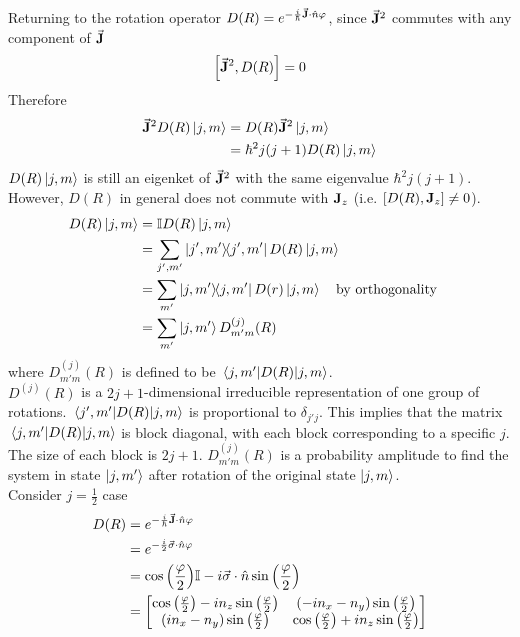\documentclass[12pt,a4paper,titlepage]{article}
\begin{document}
Returning to the rotation operator $D(R)=e^{-\frac{i}{\hbar}\vec{\vb{J}}\cdot\hat{n}\varphi}$, since $\vec{\vb{J}}^{2}$ commutes with any component of $\vec{\vb{J}}$
\begin{equation}
\comm{\vec{\vb{J}}^{2}}{D(R)}=0
\end{equation}
Therefore
\begin{equation}
\begin{aligned}
\vec{\vb{J}}^{2}D(R)\ket{j,m}&=D(R)\vec{\vb{J}}^{2}\ket{j,m}\\
&=\hbar^{2}j(j+1)D(R)\ket{j,m}
\end{aligned}
\end{equation}
$D(R)\ket{j,m}$ is still an eigenket of $\vec{\vb{J}}^{2}$ with the same eigenvalue $\hbar^{2}j(j+1)$. However, $D(R)$ in general does not commute with $\vb{J}_{z}$ (i.e. $\comm{D(R)}{\vb{J}_{z}}\neq 0$).
\begin{equation}
\begin{aligned}
D(R)\ket{j,m}&=\mathbb{I}D(R)\ket{j,m}\\
&=\sum_{j',m'}\op{j',m'}D(R)\ket{j,m}\\
&=\sum_{m'}\op{j,m'}D(r)\ket{j,m}\qq{by orthogonality}\\
&=\sum_{m'}\ket{j,m'}D_{m'm}^{(j)}(R)
\end{aligned}
\end{equation}
where $D_{m'm}^{(j)}(R)$ is defined to be $\mel{j,m'}{D(R)}{j,m}$.\\

$D^{(j)}(R)$ is a $2j+1$-dimensional irreducible representation of one group of rotations. $\mel{j',m'}{D(R)}{j,m}$ is proportional to $\delta_{j'j}$. This implies that the matrix $\mel{j,m'}{D(R)}{j,m}$ is block diagonal, with each block corresponding to a specific $j$. The size of each block is $2j+1$. $D_{m'm}^{(j)}(R)$ is a probability amplitude to find the system in state $\ket{j,m'}$ after rotation of the original state $\ket{j,m}$.\\

Consider $j=\frac{1}{2}$ case
\begin{equation}
\begin{aligned}
D(R)&=e^{-\frac{i}{\hbar}\vec{\vb{J}}\cdot\hat{n}\varphi}\\
&=e^{-\frac{i}{2}\vec{\sigma}\cdot\hat{n}\varphi}\\
&=\cos\qty(\frac{\varphi}{2})\mathbb{I}-i\vec{\sigma}\cdot\hat{n}\sin\qty(\frac{\varphi}{2})\\
&=\mqty[\cos\qty(\frac{\varphi}{2})-in_{z}\sin\qty(\frac{\varphi}{2}) & (-in_{x}-n_{y})\sin\qty(\frac{\varphi}{2})\\ (in_{x}-n_{y})\sin\qty(\frac{\varphi}{2}) & \cos\qty(\frac{\varphi}{2})+in_{z}\sin\qty(\frac{\varphi}{2})]
\end{aligned}
\end{equation}
\end{document}
